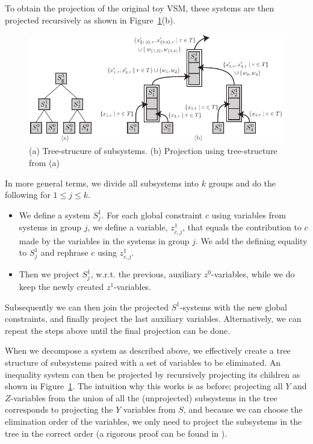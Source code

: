 \documentclass{llncs}
\begin{document}
To obtain the projection of the original toy VSM, these systems are then projected recursively as shown in Figure~\ref{fig:decomp2}(b).
%
\begin{figure}[h]
	\centering
		\includegraphics{figures/Example7.pdf}
	\caption{(a) Tree-strucure of subsystems. (b) Projection using tree-structure from (a)}
	\label{fig:decomp2}
\end{figure}

\noindent In more general terms, we divide all subsystems into $k$ groups and do the following for $1\leq j\leq k$. 
\begin{itemize}[noitemsep,topsep=0pt]
\item We define a system $S^1_j$. For each global constraint $c$ using variables from systems in group $j$, we define a variable, $z^1_{c,j}$, that equals the contribution to $c$ made by the variables in the systems in group $j$. We add the defining equality to $S^1_j$ and rephrase $c$ using $z^1_{c,j}$.
\item Then we project $S^1_j$, w.r.t. the previous, auxiliary $z^0$-variables, while we do keep the newly created $z^1$-variables.
\end{itemize} 
Subsequently we can then join the projected $S^1$-systems with the new global constraints, and finally project the last auxiliary variables. Alternatively, we can repeat the steps above until the final projection can be done. 

When we decompose a system as described above, we effectively create a tree structure of subsystems paired with a set of variables to be eliminated. An inequality system can then be projected by recursively projecting its children as shown in Figure~\ref{fig:decomp2}.
The intuition why this works is as before; projecting all $Y$ and $Z$-variables from the union of all the (unprojected) subsystems in the tree corresponds to projecting the $Y$ variables from $S$, and because we can choose the elimination order of the variables, we only need to project the subsystems in the tree in the correct order (a rigorous proof can be found in \cite{mytechrep}).
\end{document}
